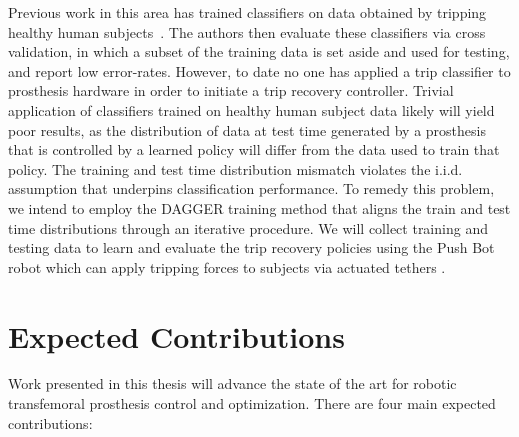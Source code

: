 Previous work in this area has trained classifiers on data obtained by tripping
healthy human subjects~\citep{lawson2010stumble, shirota2014recovery}. The
authors then evaluate these classifiers via cross validation, in which a subset
of the training data is set aside and used for testing, and report low
error-rates.  However, to date no one has applied a trip classifier to
prosthesis hardware in order to initiate a trip recovery controller. Trivial
application of classifiers trained on healthy human subject data likely will
yield poor results, as the distribution of data at test time generated by a
prosthesis that is controlled by a learned policy will differ from the data used
to train that policy. The training and test time distribution mismatch violates
the i.i.d. assumption that
underpins classification performance. To remedy this problem, we intend to
employ the DAGGER training method \citep{ross2011reduction} that aligns the
train and test time distributions through an iterative procedure. We will
collect training and testing data to learn and evaluate the trip recovery
policies using the Push Bot robot which can apply tripping forces to subjects
via actuated tethers \citep{emanuel2016disturbance}.

\section{Expected Contributions}\label{sec:intro_contributions}

Work presented in this thesis will advance the state of the art for robotic
transfemoral prosthesis control and optimization. There are four main expected 
contributions: 

